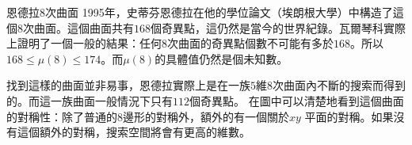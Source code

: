 \begin{surferPage}{恩德拉8次曲面}
1995年，史蒂芬恩德拉在他的學位論文（埃朗根大學）中構造了這個$8$次曲面。這個曲面共有$168$個奇異點，這仍然是當今的世界紀錄。瓦爾琴科實際上證明了一個一般的結果：任何$8$次曲面的奇異點個數不可能有多於$168$。所以$168 \le \mu(8) \le 174$。而$\mu(8)$的具體值仍然是個未知數。

找到這樣的曲面並非易事，恩德拉實際上是在一族$5$維$8$次曲面內不斷的搜索而得到的。而這一族曲面一般情況下只有$112$個奇異點。
在圖中可以清楚地看到這個曲面的對稱性：除了普通的$8$邊形的對稱外，額外的有一個關於$xy$ 平面的對稱。如果沒有這個額外的對稱，搜索空間將會有更高的維數。
\end{surferPage}

